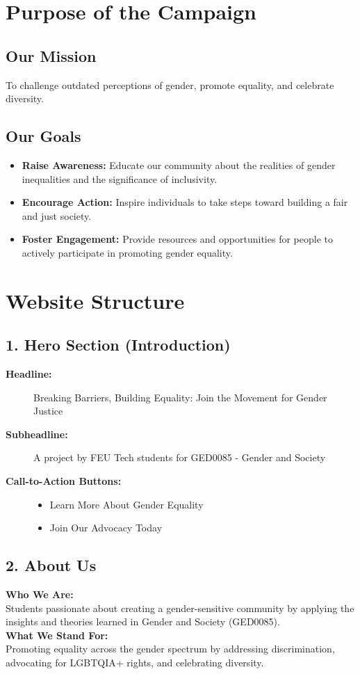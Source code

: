 \documentclass{article}
\begin{document}
\section*{Purpose of the Campaign}
\subsection*{Our Mission}
To challenge outdated perceptions of gender, promote equality, and celebrate diversity.

\subsection*{Our Goals}
\begin{itemize}[leftmargin=*]
    \item \textbf{Raise Awareness:} Educate our community about the realities of gender inequalities and the significance of inclusivity.
    \item \textbf{Encourage Action:} Inspire individuals to take steps toward building a fair and just society.
    \item \textbf{Foster Engagement:} Provide resources and opportunities for people to actively participate in promoting gender equality.
\end{itemize}

\section*{Website Structure}
\subsection*{1. Hero Section (Introduction)}
\begin{description}
    \item[\textbf{Headline:}] 
    Breaking Barriers, Building Equality: Join the Movement for Gender Justice
    \item[\textbf{Subheadline:}] 
    A project by FEU Tech students for GED0085 - Gender and Society
    \item[\textbf{Call-to-Action Buttons:}]
    \begin{itemize}[label={--}]
        \item Learn More About Gender Equality
        \item Join Our Advocacy Today
    \end{itemize}
\end{description}

\subsection*{2. About Us}
\textbf{Who We Are:} \\
Students passionate about creating a gender-sensitive community by applying the insights and theories learned in Gender and Society (GED0085). \\
\textbf{What We Stand For:} \\
Promoting equality across the gender spectrum by addressing discrimination, advocating for LGBTQIA+ rights, and celebrating diversity.
\end{document}
